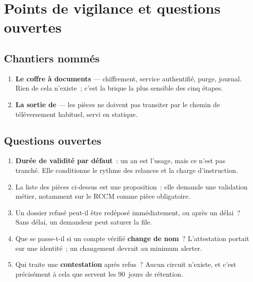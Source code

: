 \chapter{Points de vigilance et questions ouvertes}

\section{Chantiers nommés}

\begin{enumerate}[leftmargin=1.6em]
  \item \textbf{Le coffre à documents} --- chiffrement, service authentifié, purge, journal.
        Rien de cela n'existe~; c'est la brique la plus sensible des cinq étapes.
  \item \textbf{La sortie de } --- les pièces ne doivent pas transiter par le
        chemin de téléversement habituel, servi en statique.
\end{enumerate}

\section{Questions ouvertes}

\begin{enumerate}[leftmargin=1.6em]
  \item \textbf{Durée de validité par défaut}~: un an est l'usage, mais ce n'est pas tranché.
        Elle conditionne le rythme des relances et la charge d'instruction.
  \item La liste des pièces ci-dessus est une proposition~: elle demande une validation
        métier, notamment sur le RCCM comme pièce obligatoire.
  \item Un dossier refusé peut-il être redéposé immédiatement, ou après un délai~? Sans
        délai, un demandeur peut saturer la file.
  \item Que se passe-t-il si un compte vérifié \textbf{change de nom}~? L'attestation portait
        sur une identité~; un changement devrait au minimum alerter.
  \item Qui traite une \textbf{contestation} après refus~? Aucun circuit n'existe, et c'est
        précisément à cela que servent les 90~jours de rétention.
\end{enumerate}
